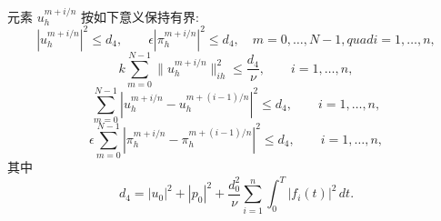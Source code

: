 \begin{Lemma}
\label{lem:ch3-ac-unconditional-discrete-estimates}
元素 $u_h^{m+i/n}$ 按如下意义保持有界:
\begin{equation}
|u_h^{m+i/n}|^2\leq d_4,
\qquad\epsilon|\pi_h^{m+i/n}|^2\leq d_4,
\quad m=0,\ldots,N-1,quad i=1,\ldots,n,
\label{eq:ch3-ac-discrete-pointwise-energy-bound}
\end{equation}
\begin{equation}
k\sum_{m=0}^{N-1}\lVert u_h^{m+i/n}\rVert_{ih}^2
\leq\frac{d_4}{\nu},
\qquad i=1,\ldots,n,
\label{eq:ch3-ac-discrete-directional-energy-sum}
\end{equation}
\begin{equation}
\sum_{m=0}^{N-1}
|u_h^{m+i/n}-u_h^{m+(i-1)/n}|^2
\leq d_4,
\qquad i=1,\ldots,n,
\label{eq:ch3-ac-discrete-velocity-jump-sum}
\end{equation}
\begin{equation}
\epsilon\sum_{m=0}^{N-1}
|\pi_h^{m+i/n}-\pi_h^{m+(i-1)/n}|^2
\leq d_4,
\qquad i=1,\ldots,n,
\label{eq:ch3-ac-discrete-pressure-jump-sum}
\end{equation}
其中
\[
d_4=|u_0|^2+|p_0|^2
+\frac{d_0^2}{\nu}\sum_{i=1}^n\int_0^T|f_i(t)|^2\,dt.
\]
\end{Lemma}


